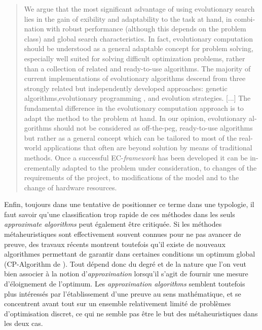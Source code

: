 \foreignblockquote{english}[\cite{Back1997a}]{We argue that the most significant advantage of using evolutionary search lies in the gain of exibility and adaptability to the task at hand, in combination with robust performance (although this depends on the problem class) and global search characteristics. In fact, evolutionary computation should be understood as a general adaptable concept for problem solving, especially well suited for solving difficult optimization problems, rather than a collection of related and ready-to-use algorithms. The majority of current implementations of evolutionary algorithms descend from three strongly related but independently developed approaches: genetic algorithms,evolutionary programming , and evolution strategies. [...] The fundamental difference in the evolutionary computation approach is to adapt the method to the problem at hand. In our opinion, evolutionary algorithms should not be considered as off-the-peg, ready-to-use algorithms but rather as a general concept which can be tailored to most of the real-world applications that often are beyond solution by means of traditional methods. Once a successful EC-\textit{framework} has been developed it can be incrementally adapted to the problem under consideration, to changes of the requirements of the project, to modifications of the model and to the change of hardware resources.}

Enfin, toujours dans une tentative de positionner ce terme dans une typologie, il faut savoir qu'une classification trop rapide de ces méthodes dans les seuls \textit{approximate algorithms} peut également être critiquée. Si les méthodes métaheuristiques sont effectivement souvent connues pour ne pas avancer de preuve, des travaux récents montrent toutefois qu'il existe de nouveaux algorithmes permettant de garantir dans certaines conditions un optimum global (CP-Algorithm de \autocite{Reuillon2015}). Tout dépend donc du degré et de la nature que l'on veut bien associer à la notion d'\textit{approximation} lorsqu'il s'agit de fournir une mesure d'éloignement de l'optimum. Les \textit{approximation algorithms} semblent toutefois plus intéressés par l'établissement d'une preuve au sens mathématique, et se concentrent avant tout sur un ensemble relativement limité de problèmes d'optimisation discret, ce qui ne semble pas être le but des métaheuristiques dans les deux cas. \autocites[1-6]{Kann1992}[13-15]{Williamson2011} %


